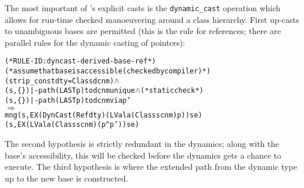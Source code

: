 \documentclass[11pt]{article}
\newcommand{\lbr}{\texttt{\{}}
\newcommand{\rbr}{\texttt{\}}}
\begin{document}
The most important of \cpp{}'s explicit casts is the
\texttt{dynamic_cast} operation which allows for run-time checked
manoeuvering around a class hierarchy.  First up-casts to unambiguous bases
are permitted (this is the rule for references; there are parallel
rules for the dynamic casting of pointers):
\begin{center}
\begin{minipage}{\textwidth}
%
\begin{alltt}
(* RULE-ID: dyncast-derived-base-ref *)
(* assume that base is accessible (checked by compiler) *)
     (strip_const dty = Class dcnm) \(\land\)
     (s,\lbr\rbr) |- path (LAST p) to dcnm unique \(\land\) (* static check *)
     (s,\lbr\rbr) |- path (LAST p) to dcnm via p'
   \(\Rightarrow\)
     mng (s, EX (DynCast (Ref dty) (LVal a (Class scnm) p)) se)
         (s, EX (LVal a (Class scnm) (p ^ p')) se)
\end{alltt}
\end{minipage}
\end{center}
The second hypothesis is strictly redundant in the dynamics; along
with the base's accessibility, this will be checked before the
dynamics gets a chance to execute.  The third hypothesis is where the
extended path from the dynamic type up to the new base is
constructed.
\end{document}
